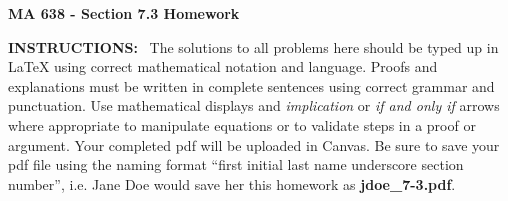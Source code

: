 \documentclass[11pt]{article}
\def\noin{\noindent}
\begin{document}
\thispagestyle{empty}
%
%


\large
\noin \textbf{MA 638 - Section 7.3 Homework}\\


\normalsize

\noin \textbf{INSTRUCTIONS:} \ The solutions to all problems here should be typed up in {\LaTeX} using correct mathematical notation and language.  Proofs and explanations must be written in complete sentences using correct grammar and punctuation.  Use mathematical displays and \emph{implication} or \emph{if and only if} arrows where appropriate to manipulate equations or to validate steps in a proof or argument.  Your completed pdf will be uploaded in Canvas.  Be sure to save your pdf file using the naming format ``first initial last name underscore section number'', i.e. Jane Doe would save her this homework as \textbf{jdoe\_7-3.pdf}. \\
\end{document}
